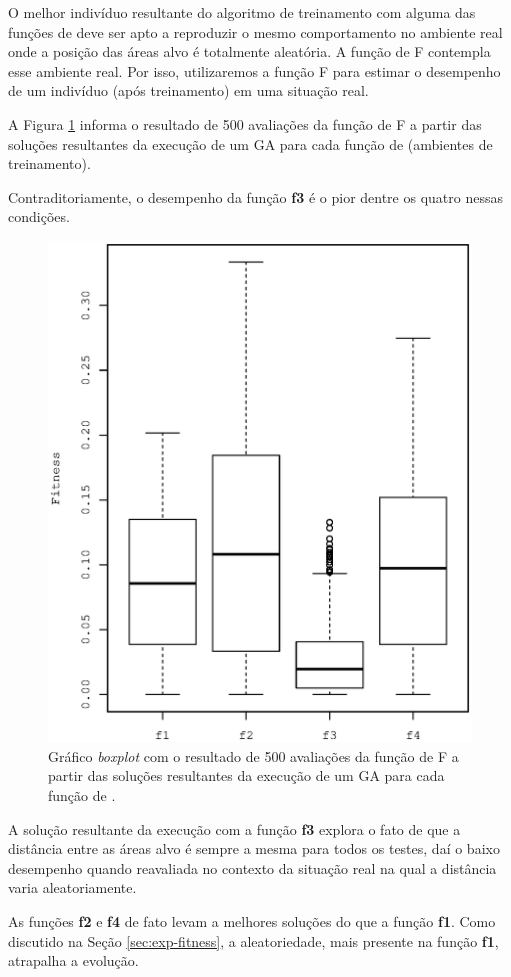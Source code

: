 O melhor indivíduo resultante do algoritmo de treinamento com alguma das funções de \fitness deve ser apto a reproduzir o mesmo comportamento no ambiente real onde a posição das áreas alvo é totalmente aleatória. A função de \fitness F contempla esse ambiente real. Por isso, utilizaremos a função F para estimar o desempenho de um indivíduo (após treinamento) em uma situação real.

A Figura \ref{fig:reeval} informa o resultado de 500 avaliações da função de \fitness F a partir das soluções resultantes da execução de um GA para cada função de \fitness (ambientes de treinamento).

Contraditoriamente, o desempenho da função \textbf{f3} é o pior dentre os quatro nessas condições.

\begin{figure}[h]
    \centering
    \includegraphics[width=.4\textwidth]{figures/reeval}
    \caption{Gráfico \textit{boxplot} com o resultado de 500 avaliações da função de \fitness F a partir das soluções resultantes da execução de um GA para cada função de \fitness.}
    \label{fig:reeval}
\end{figure}

A solução resultante da execução com a função \textbf{f3} explora o fato de que a distância entre as áreas alvo é sempre a mesma para todos os testes, daí o baixo desempenho quando reavaliada no contexto da situação real na qual a distância varia aleatoriamente.

As funções \textbf{f2} e \textbf{f4} de fato levam a melhores soluções do que a função \textbf{f1}. Como discutido na Seção \ref{sec:exp-fitness}, a aleatoriedade, mais presente na função \textbf{f1}, atrapalha a evolução.


\pagebreak

